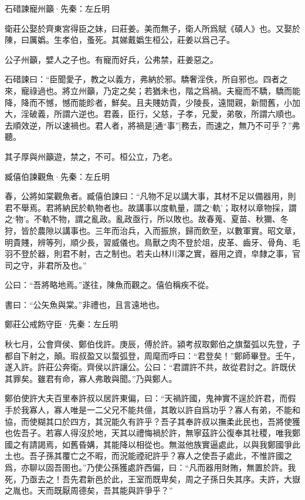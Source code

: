 \documentclass[12pt,a4paper]{ctexbook}
\begin{document}
石碏諫寵州籲·先秦：左丘明 \par
衛莊公娶於齊東宮得臣之妹，曰莊姜。美而無子，衛人所爲賦《碩人》也。又娶於陳，曰厲嬀。生孝伯，蚤死。其娣戴嬀生桓公，莊姜以爲己子。\par
公子州籲，嬖人之子也。有寵而好兵，公弗禁，莊姜惡之。\par
石碏諫曰：“臣聞愛子，教之以義方，弗納於邪。驕奢淫佚，所自邪也。四者之來，寵祿過也。將立州籲，乃定之矣；若猶未也，階之爲禍。夫寵而不驕，驕而能降，降而不憾，憾而能眕者，鮮矣。且夫賤妨貴，少陵長，遠間親，新間舊，小加大，淫破義，所謂六逆也。君義，臣行，父慈，子孝，兄愛，弟敬，所謂六順也。去順效逆，所以速禍也。君人者，將禍是[通“事”]務去，而速之，無乃不可乎？”弗聽。\par
其子厚與州籲遊，禁之，不可。桓公立，乃老。\par
臧僖伯諫觀魚·先秦：左丘明 \par
春，公將如棠觀魚者。臧僖伯諫曰：“凡物不足以講大事，其材不足以備器用，則君不舉焉。君將納民於軌物者也。故講事以度軌量，謂之‘軌’；取材以章物採，謂之‘物’。不軌不物，謂之亂政。亂政亟行，所以敗也。故春蒐、夏苗、秋獮、冬狩，皆於農隙以講事也。三年而治兵，入而振旅，歸而飲至，以數軍實。昭文章，明貴賤，辨等列，順少長，習威儀也。鳥獸之肉不登於俎，皮革、齒牙、骨角、毛羽不登於器，則君不射，古之制也。若夫山林川澤之實，器用之資，皁隸之事，官司之守，非君所及也。”\par
公曰：“吾將略地焉。”遂往，陳魚而觀之。僖伯稱疾不從。\par
書曰：“公矢魚與棠。”非禮也，且言遠地也。\par
鄭莊公戒飭守臣·先秦：左丘明 \par
秋七月，公會齊侯、鄭伯伐許。庚辰，傅於許。潁考叔取鄭伯之旗蝥弧以先登，子都自下射之，顛。瑕叔盈又以蝥弧登，周麾而呼曰：“君登矣！”鄭師畢登。壬午，遂入許。許莊公奔衛。齊侯以許讓公。公曰：“君謂許不共，故從君討之。許既伏其罪矣。雖君有命，寡人弗敢與聞。”乃與鄭人。\par
鄭伯使許大夫百里奉許叔以居許東偏，曰：“天禍許國，鬼神實不逞於許君，而假手於我寡人，寡人唯是一二父兄不能共億，其敢以許自爲功乎？寡人有弟，不能和協，而使糊其口於四方，其況能久有許乎？吾子其奉許叔以撫柔此民也，吾將使獲也佐吾子。若寡人得沒於地，天其以禮悔禍於許，無寧茲許公復奉其社稷，唯我鄭國之有請謁焉，如舊昏媾，其能降以相從也。無滋他族實逼處此，以與我鄭國爭此土也。吾子孫其覆亡之不暇，而況能禋祀許乎？寡人之使吾子處此，不惟許國之爲，亦聊以固吾圉也。”乃使公孫獲處許西偏，曰：“凡而器用財賄，無置於許。我死，乃亟去之！吾先君新邑於此，王室而既卑矣，周之子孫日失其序。夫許，大嶽之胤也。天而既厭周德矣，吾其能與許爭乎？”\par
\end{document}
